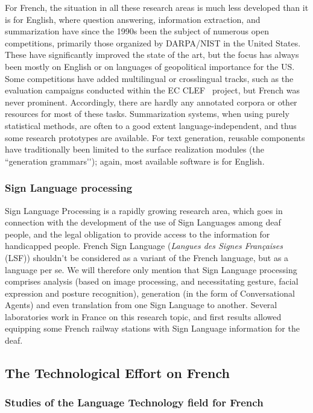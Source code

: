 \begin{multicols}{2}
For French, the situation in all these research areas is much less
developed than it is for English, where question answering,
information extraction, and summarization have since the 1990s been
the subject of numerous open competitions, primarily those organized
by DARPA/NIST in the United States. These have significantly improved
the state of the art, but the focus has always been mostly on English
or on languages of geopolitical importance for the US. Some
competitions have added multilingual or crosslingual tracks, such as
the evaluation campaigns conducted within the EC CLEF~\cite{clef}
project, but French was never prominent. Accordingly, there are hardly
any annotated corpora or other resources for most of these
tasks. Summarization systems, when using purely statistical methods,
are often to a good extent language-independent, and thus some
research prototypes are available. For text generation, reusable
components have traditionally been limited to the surface realization
modules (the ``generation grammars{\mbox '}{\mbox '}); again, most available software is
for English.

\subsubsection{Sign Language processing}

Sign Language Processing is a rapidly growing research area, which
goes in connection with the development of the use of Sign Languages
among deaf people, and the legal obligation to provide access to the
information for handicapped people. French Sign Language ({\em Langues des
Signes Françaises} (LSF)) shouldn{\mbox '}t be considered as a variant of the
French language, but as a language per se. We will therefore only
mention that Sign Language processing comprises analysis (based on
image processing, and necessitating gesture, facial expression and
posture recognition), generation (in the form of Conversational
Agents) and even translation from one Sign Language to
another. Several laboratories work in France on this research topic,
and first results allowed equipping some French railway stations with
Sign Language information for the deaf.

\subsection{The Technological Effort on French}

\subsubsection{Studies of the Language Technology field for French}


\end{multicols}
